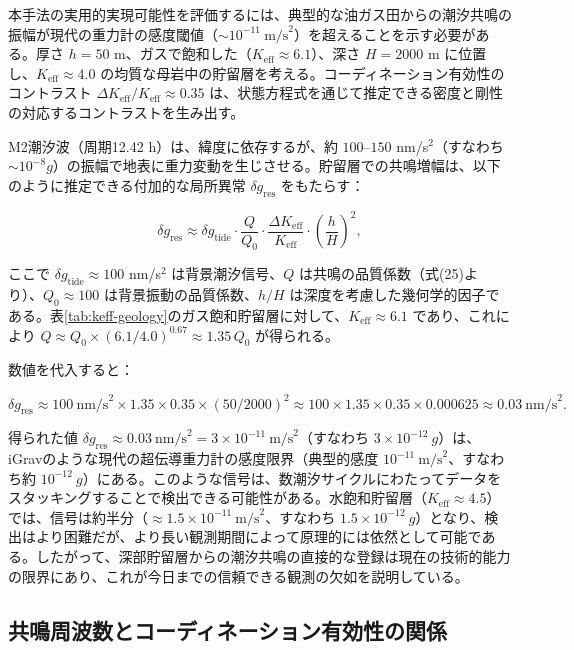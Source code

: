 \documentclass[12pt,a4paper]{article}
\theoremstyle{remark}
\newcommand{\Keff}{K_{\mathrm{eff}}}
\begin{document}
	本手法の実用的実現可能性を評価するには、典型的な油ガス田からの潮汐共鳴の振幅が現代の重力計の感度閾値（\( \sim 10^{-11}\ \text{m/s}^2\)）を超えることを示す必要がある。厚さ \(h = 50\) m、ガスで飽和した（\(\Keff \approx 6.1\)）、深さ \(H = 2000\) m に位置し、\(\Keff \approx 4.0\) の均質な母岩中の貯留層を考える。コーディネーション有効性のコントラスト \(\Delta \Keff / \Keff \approx 0.35\) は、状態方程式を通じて推定できる密度と剛性の対応するコントラストを生み出す。
	
	M2潮汐波（周期12.42 h）は、緯度に依存するが、約 \(100\)–\(150\) nm/s\(^2\)（すなわち \(\sim 10^{-8} g\)）の振幅で地表に重力変動を生じさせる。貯留層での共鳴増幅は、以下のように推定できる付加的な局所異常 \(\delta g_{\text{res}}\) をもたらす：
	
	\begin{equation}
		\delta g_{\text{res}} \approx \delta g_{\text{tide}} \cdot \frac{Q}{Q_0} \cdot \frac{\Delta \Keff}{\Keff} \cdot \left(\frac{h}{H}\right)^2,
		\label{eq:signal_estimate}
	\end{equation}
	
	ここで \(\delta g_{\text{tide}} \approx 100\) nm/s\(^2\) は背景潮汐信号、\(Q\) は共鳴の品質係数（式(25)より）、\(Q_0 \approx 100\) は背景振動の品質係数、\(h/H\) は深度を考慮した幾何学的因子である。表\ref{tab:keff-geology}のガス飽和貯留層に対して、\(\Keff \approx 6.1\) であり、これにより \(Q \approx Q_0 \times (6.1/4.0)^{0.67} \approx 1.35\,Q_0\) が得られる。
	
	数値を代入すると：
	
	\[
	\delta g_{\text{res}} \approx 100\ \text{nm/s}^2 \times 1.35 \times 0.35 \times (50/2000)^2 \approx 100 \times 1.35 \times 0.35 \times 0.000625 \approx 0.03\ \text{nm/s}^2.
	\]
	
	得られた値 \(\delta g_{\text{res}} \approx 0.03\ \text{nm/s}^2 = 3 \times 10^{-11}\ \text{m/s}^2\)（すなわち \(3 \times 10^{-12}\ g\)）は、iGravのような現代の超伝導重力計の感度限界（典型的感度 \(10^{-11}\ \text{m/s}^2\)、すなわち約 \(10^{-12}\ g\)）にある。このような信号は、数潮汐サイクルにわたってデータをスタッキングすることで検出できる可能性がある。水飽和貯留層（\(\Keff \approx 4.5\)）では、信号は約半分（\( \approx 1.5\times10^{-11}\ \text{m/s}^2\)、すなわち \(1.5\times10^{-12}\ g\)）となり、検出はより困難だが、より長い観測期間によって原理的には依然として可能である。したがって、深部貯留層からの潮汐共鳴の直接的な登録は現在の技術的能力の限界にあり、これが今日までの信頼できる観測の欠如を説明している。
	
	\subsection{共鳴周波数とコーディネーション有効性の関係}
	\label{subsec:frequency_keff}
	
\end{document}
